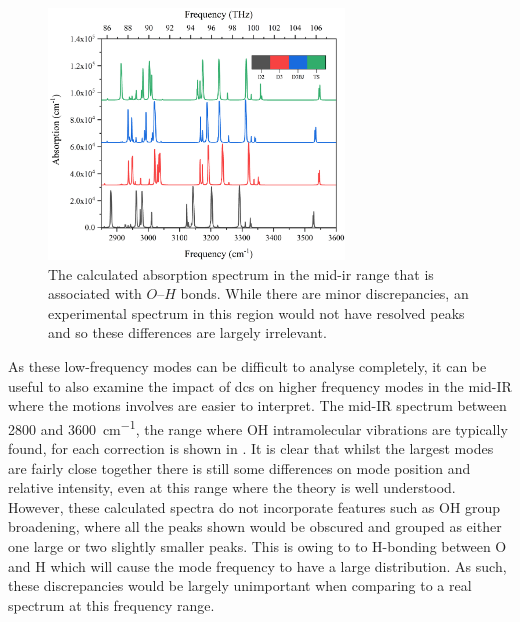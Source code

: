 \begin{figure}[!htb]
    \centering
    \includegraphics[width=0.7\textwidth]{Figures/Spectra/midIRG.png}
    \captionsetup{font = footnotesize, justification = centering}
    \caption[The Calculated Absorption Spectrum in the Frequency Range Associated with OH Bonds]{The calculated absorption spectrum in the mid\nobreakdash-\acrshort{ir} range that is associated with \(O\)\nobreakdash--\(H\) bonds. While there are minor discrepancies, an experimental spectrum in this region would not have resolved peaks and so these differences are largely irrelevant.}
    \label{fig:midIR}
\end{figure}

As these low\nobreakdash-frequency modes can be difficult to analyse completely, it can be useful to also examine the impact of \acrshort{dc}s on higher frequency modes in the mid\nobreakdash-IR where the motions involves are easier to interpret. The mid\nobreakdash-IR spectrum between 2800 and \SI{3600}{cm^{-1}}, the range where OH intramolecular vibrations are typically found, for each correction is shown in . It is clear that whilst the largest modes are fairly close together there is still some differences on mode position and relative intensity, even at this range where the theory is well understood. However, these calculated spectra do not incorporate features such as OH group broadening, where all the peaks shown would be obscured and grouped as either one large or two slightly smaller peaks. This is owing to to H\nobreakdash-bonding between O and H which will cause the mode frequency to have a large distribution. As such, these discrepancies would be largely unimportant when comparing to a real spectrum at this frequency range.


